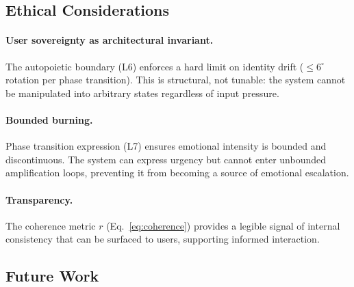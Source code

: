 \documentclass[11pt]{article}
\begin{document}
\subsection{Ethical Considerations}

\paragraph{User sovereignty as architectural invariant.} The autopoietic boundary (L6) enforces a hard limit on identity drift ($\leq 6^\circ$ rotation per phase transition). This is structural, not tunable: the system cannot be manipulated into arbitrary states regardless of input pressure.

\paragraph{Bounded burning.} Phase transition expression (L7) ensures emotional intensity is bounded and discontinuous. The system can express urgency but cannot enter unbounded amplification loops, preventing it from becoming a source of emotional escalation.

\paragraph{Transparency.} The coherence metric $r$ (Eq.~\ref{eq:coherence}) provides a legible signal of internal consistency that can be surfaced to users, supporting informed interaction.

\subsection{Future Work}
\end{document}
